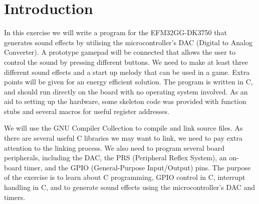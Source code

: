 \chapter{Introduction}


In this exercise we will write a program for the EFM32GG-DK3750 that generates sound effects by utilising the microcontroller's DAC (Digital to Analog Converter). A prototype gamepad will be connected that allows the user to control the sound by pressing different buttons. We need to make at least three different sound effects and a start up melody that can be used in a game. Extra points will be given for an energy efficient solution. The program is written in C, and should run directly on the board with no operating system involved. As an aid to setting up the hardware, some skeleton code was provided with function stubs and several macros for useful register addresses.

We will use the GNU Compiler Collection to compile and link source files. As there are several useful C libraries we may want to link, we need to pay extra attention to the linking process. We also need to program several board peripherals, including the DAC, the PRS (Peripheral Reflex System), an on-board timer, and the GPIO (General-Purpose Input/Output) pins. The purpose of the exercise is to learn about C programming, GPIO control in C, interrupt handling in C, and to generate sound effects using the microcontroller's DAC and timers.


